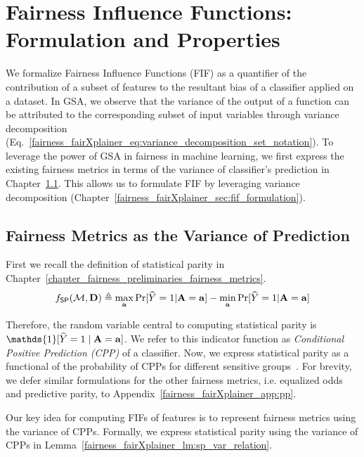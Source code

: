 \section{Fairness Influence Functions: Formulation and Properties}\label{fairness_fairXplainer_sec:fifs}
We formalize Fairness Influence Functions (FIF) as a quantifier of the contribution of a subset of features to the resultant bias of a classifier applied on a dataset.  In GSA, we observe that the variance of the output of a function can be attributed to the corresponding subset of input variables through variance decomposition (Eq.~\eqref{fairness_fairXplainer_eq:variance_decomposition_set_notation}). To leverage the power of GSA in fairness in machine learning, we first express the existing fairness metrics in terms of the variance of classifier's prediction in Chapter~\ref{fairness_fairXplainer_sec:metric_as_variance}. This allows us to formulate FIF by leveraging variance decomposition (Chapter~\ref{fairness_fairXplainer_sec:fif_formulation}). 


\subsection{Fairness Metrics as the Variance of Prediction}
\label{fairness_fairXplainer_sec:metric_as_variance}
First we recall the definition of statistical parity in Chapter~\ref{chapter_fairness_preliminaries_fairness_metrics}.
\[ f_{\mathsf{SP}}(\mathcal{M}, \mathbf{D}) \triangleq \max_{\mathbf{a}}\Pr[\widehat{Y} =1 | \mathbf{A} = \mathbf{a}] - \min_{\mathbf{a}}\Pr[\widehat{Y} =1 | \mathbf{A} = \mathbf{a}] \]

Therefore, the random variable central to computing statistical parity is $ \mathds{1}[\widehat{Y} = 1 \mid \sensitive = \mathbf{a}] $.
We refer to this indicator function as \textit{Conditional Positive Prediction (CPP)} of a classifier. Now, we express statistical parity as a functional of the probability of CPPs for different sensitive groups~\cite{benesse2021fairness}. For brevity, we defer similar formulations for the other fairness metrics, i.e. equalized odds and predictive parity, to Appendix~\ref{fairness_fairXplainer_app:pp}. %

Our key idea for computing FIFs of features is to represent fairness metrics using the variance of CPPs. Formally, we express statistical parity using the variance of CPPs in Lemma~\ref{fairness_fairXplainer_lm:sp_var_relation}.

